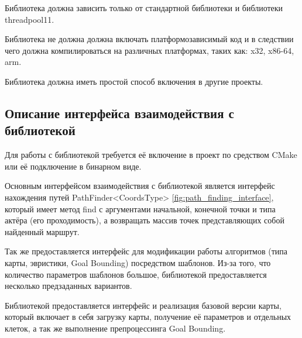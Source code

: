 Библиотека должна зависить только от стандартной библиотеки и библиотеки threadpool11.

Библиотека не должна должна включать платформозависимый код и в следствии чего должна компилироваться на различных платформах, таких как: x32, x86-64, arm.

Библиотека должна иметь простой способ включения в другие проекты.   

\subsection{Описание интерфейса взаимодействия с библиотекой}

Для работы с библиотекой требуется её включение в проект по средством CMake или её подключение в бинарном виде. 

Основным интерфейсом взаимодействия с библиотекой является интерфейс нахождения путей PathFinder<CoordsType> \cref{fig:path_finding_interface}, который имеет метод find с аргументами начальной, конечной точки и типа актёра (его проходимость), а возвращать массив точек представляющих собой найденный маршрут.


Так же предоставляется интерфейс для модификации работы алгоритмов (типа карты, эвристики, Goal Bounding) посредством шаблонов. Из-за того, что количество параметров шаблонов большое, библиотекой предоставляется несколько предзаданных вариантов.

Библиотекой предоставляется интерфейс и реализация базовой версии карты, который включает в себя загрузку карты, получение её параметров и отдельных клеток, а так же выполнение препроцессинга Goal Bounding.   
